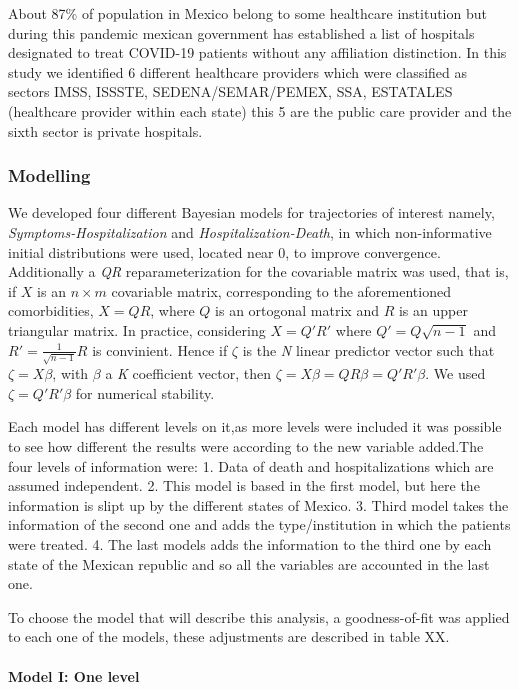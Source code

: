 \documentclass[
]{article}
\begin{document}
About 87\% of population in Mexico belong to some healthcare institution
but during this pandemic mexican government has established a list of
hospitals designated to treat COVID-19 patients without any affiliation
distinction. In this study we identified 6 different healthcare
providers which were classified as sectors IMSS, ISSSTE,
SEDENA/SEMAR/PEMEX, SSA, ESTATALES (healthcare provider within each
state) this 5 are the public care provider and the sixth sector is
private hospitals.

\hypertarget{modelling}{%
\subsubsection{Modelling}\label{modelling}}

We developed four different Bayesian models for trajectories of interest
namely, \emph{Symptoms-Hospitalization} and
\emph{Hospitalization-Death}, in which non-informative initial
distributions were used, located near \(0\), to improve convergence.
Additionally a \textit{QR} reparameterization for the covariable matrix
was used, that is, if \(X\) is an \(n \times m\) covariable matrix,
corresponding to the aforementioned comorbidities, \(X=QR\), where \(Q\)
is an ortogonal matrix and \(R\) is an upper triangular matrix. In
practice, considering \(X=Q'R'\) where \(Q'=Q\sqrt{n-1}\) and
\(R'=\frac{1}{\sqrt{n-1}}R\) is convinient. Hence if \(\zeta\) is the
\textit{N} linear predictor vector such that \(\zeta=X\beta\), with
\(\beta\) a \textit{K} coefficient vector, then
\(\zeta=X\beta=QR\beta=Q'R'\beta\). We used \(\zeta=Q'R'\beta\) for
numerical stability.

Each model has different levels on it,as more levels were included it
was possible to see how different the results were according to the new
variable added.The four levels of information were: 1. Data of death and
hospitalizations which are assumed independent. 2. This model is based
in the first model, but here the information is slipt up by the
different states of Mexico. 3. Third model takes the information of the
second one and adds the type/institution in which the patients were
treated. 4. The last models adds the information to the third one by
each state of the Mexican republic and so all the variables are
accounted in the last one.

To choose the model that will describe this analysis, a goodness-of-fit
was applied to each one of the models, these adjustments are described
in table XX.

\hypertarget{model-i-one-level}{%
\paragraph{Model I: One level}\label{model-i-one-level}}
\end{document}
